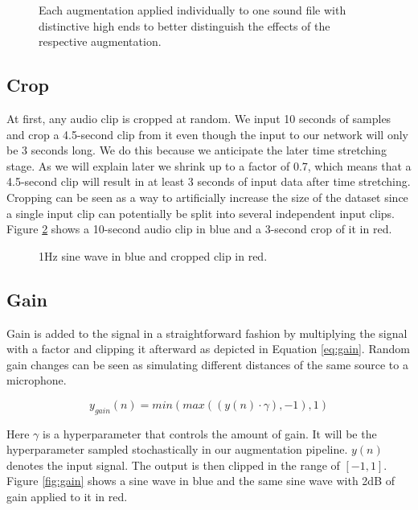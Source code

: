 \begin{figure}[H]
    \centering
    
    \caption[Augmentations]{Each augmentation applied individually to one sound file with distinctive high ends to better distinguish the effects of the respective augmentation.}
    \label{fig:augmentations}
\end{figure}

\subsection{Crop}

At first, any audio clip is cropped at random. We input 10 seconds of samples and crop a 4.5-second clip from it even though the input to our network will only be 3 seconds long. We do this because we anticipate the later time stretching stage. As we will explain later we shrink up to a factor of 0.7, which means that a 4.5-second clip will result in at least 3 seconds of input data after time stretching. Cropping can be seen as a way to artificially increase the size of the dataset since a single input clip can potentially be split into several independent input clips. Figure \ref{fig:crop} shows a 10-second audio clip in blue and a 3-second crop of it in red.

\begin{figure}[H]
    \centering
    
    \caption[Crop]{1Hz sine wave in blue and cropped clip in red.}
    \label{fig:crop}
\end{figure}

\subsection{Gain}

Gain is added to the signal in a straightforward fashion by multiplying the signal with a factor and clipping it afterward as depicted in Equation \ref{eq:gain}. Random gain changes can be seen as simulating different distances of the same source to a microphone.

\begin{equation}\label{eq:gain}
    y_{gain}(n) = min(max((y(n) \cdot \gamma), -1), 1)
\end{equation}

Here $\gamma$ is a hyperparameter that controls the amount of gain. It will be the hyperparameter sampled stochastically in our augmentation pipeline. $y(n)$ denotes the input signal. The output is then clipped in the range of $[-1,1]$. Figure \ref{fig:gain} shows a sine wave in blue and the same sine wave with 2dB of gain applied to it in red.

